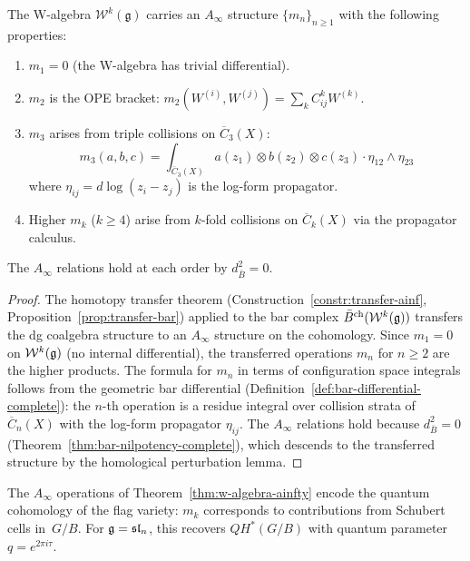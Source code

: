 \begin{theorem}
\label{thm:w-algebra-ainfty}
The W-algebra $\mathcal{W}^k(\mathfrak{g})$ carries an $A_\infty$
structure $\{m_n\}_{n \geq 1}$ with the following properties:
\begin{enumerate}[label=\textup{(\roman*)}]
\item $m_1 = 0$ \textup{(}the W-algebra has trivial
  differential\textup{)}.
\item $m_2$ is the OPE bracket:
  $m_2(W^{(i)}, W^{(j)}) = \sum_k C^k_{ij} W^{(k)}$.
\item $m_3$ arises from triple collisions on
  $\overline{C}_3(X)$:
  \[
  m_3(a,b,c) = \int_{\overline{C}_3(X)}
  a(z_1) \otimes b(z_2) \otimes c(z_3)
  \cdot \eta_{12} \wedge \eta_{23}
  \]
  where $\eta_{ij} = d\log(z_i - z_j)$ is the
  log-form propagator.
\item Higher $m_k$ \textup{(}$k \geq 4$\textup{)} arise
  from $k$-fold collisions on $\overline{C}_k(X)$
  via the propagator calculus.
\end{enumerate}
The $A_\infty$ relations hold at each order by
$d_{\bar{B}}^2 = 0$.
\end{theorem}

\begin{proof}
The homotopy transfer theorem
(Construction~\ref{constr:transfer-ainf},
Proposition~\ref{prop:transfer-bar}) applied to the bar
complex $\bar{B}^{\mathrm{ch}}(\mathcal{W}^k(\mathfrak{g}))$
transfers the dg coalgebra structure to an $A_\infty$
structure on the cohomology.  Since $m_1 = 0$ on
$\mathcal{W}^k(\mathfrak{g})$ (no internal differential), the
transferred operations $m_n$ for $n \geq 2$ are the
higher products.  The formula for $m_n$ in terms of
configuration space integrals follows from the geometric
bar differential
(Definition~\ref{def:bar-differential-complete}): the
$n$-th operation is a residue integral over collision
strata of $\overline{C}_n(X)$ with the log-form
propagator $\eta_{ij}$.  The $A_\infty$ relations hold
because $d_{\bar{B}}^2 = 0$
(Theorem~\ref{thm:bar-nilpotency-complete}), which
descends to the transferred structure by the homological
perturbation lemma.
\end{proof}

\begin{conjecture}
\label{conj:w-algebra-quantum-cohomology}
The $A_\infty$ operations of
Theorem~\ref{thm:w-algebra-ainfty} encode the quantum
cohomology of the flag variety: $m_k$ corresponds to
contributions from Schubert cells in~$G/B$.  For
$\mathfrak{g} = \mathfrak{sl}_n$, this recovers $QH^*(G/B)$
with quantum parameter $q = e^{2\pi i \tau}$.
\end{conjecture}

